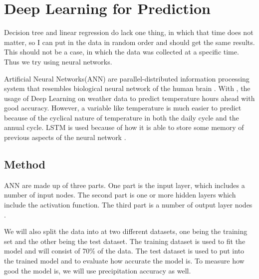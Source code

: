 \documentclass[11pt]{report}
\begin{document}
\section{Deep Learning for Prediction}\label{sec:neural}

Decision tree and linear regression do lack one thing, in which that time does not matter, so I can put in the data in random order and should get the same results. This should not be a case, in which the data was collected at a specific time. Thus we try using neural networks.

Artificial Neural Networks(ANN) are parallel-distributed information processing system that resembles biological neural network of the human brain \cite[]{ANN}.
With \cite{Norway}, the usage of Deep Learning on weather data to 
predict temperature hours ahead with good accuracy. However, a variable like temperature is much easier to predict because of the cyclical nature of temperature in both the daily cycle and the annual cycle. LSTM is used because of how it is able to store some memory of previous aspects of the neural network \cite[]{LSTM}.  
\subsection{Method}
ANN are made up of three parts. One part is the input layer, which includes a number of input nodes. The second part is one or more hidden layers which include the activation function. The third part is a number of output layer nodes \cite[]{ART}. 


We will also split the data into at two different datasets, one being the training set and the other being the test dataset. The training dataset is used to fit the model and will consist of 70\% of the data. The test dataset is used to put into the trained model and to evaluate how accurate the model is. To measure how good the model is, we will use precipitation accuracy as well. 
\end{document}
